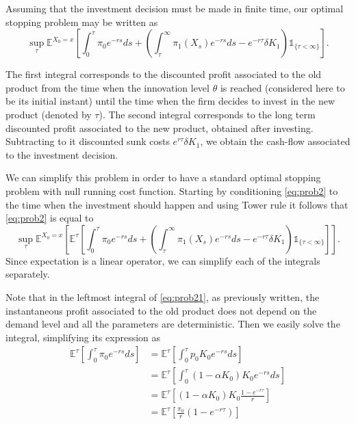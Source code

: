 Assuming that the investment decision must be made in finite time, our optimal stopping problem may be written as
\begin{equation}
\sup _\tau \mathds{E}^{X_0=x} \left[  \int_0^\tau \pi_0e^{-rs} ds +  \left( \int_\tau^\infty \pi_1(X_s)e^{-rs}ds -e^{-r\tau}\delta K_1 \right) \mathds{1}_{\{ \tau < \infty \}} \right].
\label{eq:prob2}
\end{equation}

The first integral corresponds to the discounted profit associated to the old product from the time when the innovation level $\theta$ is reached (considered here to be its initial instant) until the time when the firm decides to invest in the new product (denoted by $\tau$). The second integral corresponds to the long term discounted profit associated to the new product, obtained after investing. Subtracting to it discounted sunk costs $e^{r \tau} \delta K_1$, we obtain the cash-flow associated to the investment decision.

We can simplify this problem in order to have a standard optimal stopping problem with null running cost function.
Starting by conditioning \eqref{eq:prob2} to the time when the investment should happen and using Tower rule it follows that \eqref{eq:prob2} is equal to
\begin{equation}
\sup _\tau \mathds{E}^{X_0=x} \left[ \mathds{E}^{\tau} \left[  \int_0^\tau \pi_0e^{-rs} ds +  \left(  \int_\tau^\infty \pi_1(X_s)e^{-rs}ds -e^{-r\tau} \delta K_1   \right) \mathds{1}_{\{ \tau < \infty \}} \right] \right].
\label{eq:prob21}
\end{equation}
Since expectation is a linear operator, we can simplify each of the integrals separately.

Note that in the leftmost integral of \eqref{eq:prob21}, as previously written, the instantaneous profit associated to the old product does not depend on the demand level and all the parameters are deterministic. Then we easily solve the integral, simplifying its expression as
\begin{align}
\mathds{E}^{\tau} \left[\int_0^\tau \pi_0e^{-rs} ds \right] 
&= \mathds{E}^{\tau} \left[ \int_0^\tau p_0K_0e^{-rs} ds \right] \nonumber \\
&= \mathds{E}^{\tau} \left[ \int_0^\tau (1-\alpha K_0) K_0e^{-rs} ds \right] \nonumber \\
&= \mathds{E}^{\tau} \left[ (1-\alpha K_0) K_0 \frac{1-e^{-r \tau}}{r} \right] \nonumber\\
&= \mathds{E}^{\tau} \left[ \frac{\pi_0}{r} (1-e^{-r \tau}) \right]
\label{g2}
\end{align}

